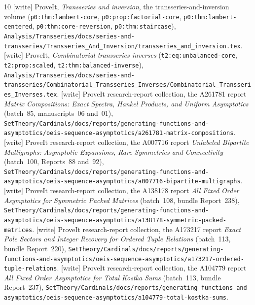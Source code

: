 \documentclass[11pt,letterpaper]{article}
\theoremstyle{remark}\newtheorem{remark}[theorem]{Remark}
\begin{document}
\begin{thebibliography}{10}
 [write] ProveIt, \emph{Transseries and inversion}, the
transseries-and-inversion volume (\texttt{p0:thm:lambert-core},
\texttt{p0:prop:factorial-core}, \texttt{p0:thm:lambert-centered},
\texttt{p0:thm:core-reversion}, \texttt{p0:thm:staircase}),
\nolinkurl{Analysis/Transseries/docs/series-and-transseries/Transseries_And_Inversion/transseries_and_inversion.tex}.
 [write] ProveIt, \emph{Combinatorial transseries
inverses} (\texttt{t2:eq:unbalanced-core}, \texttt{t2:prop:scaled},
\texttt{t2:thm:balanced-inverse}),
\nolinkurl{Analysis/Transseries/docs/series-and-transseries/Combinatorial_Transseries_Inverses/Combinatorial_Transseries_Inverses.tex}.
 [write] ProveIt research-report collection, the
A261781 report \emph{Matrix Compositions: Exact Spectra, Hankel Products,
and Uniform Asymptotics} (batch~85, manuscripts~06 and~01),
\nolinkurl{SetTheory/Cardinals/docs/reports/generating-functions-and-asymptotics/oeis-sequence-asymptotics/a261781-matrix-compositions}.
 [write] ProveIt research-report collection, the A007716
report \emph{Unlabeled Bipartite Multigraphs: Asymptotic Expansions, Rare
Symmetries and Connectivity} (batch~100, Reports~88 and~92),
\nolinkurl{SetTheory/Cardinals/docs/reports/generating-functions-and-asymptotics/oeis-sequence-asymptotics/a007716-bipartite-multigraphs}.
 [write] ProveIt research-report collection, the A138178
report \emph{All Fixed Order Asymptotics for Symmetric Packed Matrices}
(batch~108, bundle Report~238),
\nolinkurl{SetTheory/Cardinals/docs/reports/generating-functions-and-asymptotics/oeis-sequence-asymptotics/a138178-symmetric-packed-matrices}.
 [write] ProveIt research-report collection, the A173217
report \emph{Exact Pole Sectors and Integer Recovery for Ordered Tuple
Relations} (batch~113, bundle Report~220),
\nolinkurl{SetTheory/Cardinals/docs/reports/generating-functions-and-asymptotics/oeis-sequence-asymptotics/a173217-ordered-tuple-relations}.
 [write] ProveIt research-report collection, the A104779
report \emph{All Fixed Order Asymptotics for Total Kostka Sums}
(batch~113, bundle Report~237),
\nolinkurl{SetTheory/Cardinals/docs/reports/generating-functions-and-asymptotics/oeis-sequence-asymptotics/a104779-total-kostka-sums}.
\end{thebibliography}
\endgroup
\end{document}

